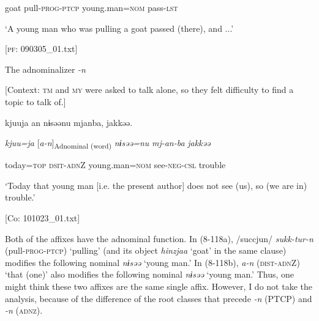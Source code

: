     goat  pull-\textsc{prog}-\textsc{ptcp}  young.man=\textsc{nom}  pass-\textsc{lst}

    ‘A young man who was pulling a goat passed (there), and ...’

  [\textsc{pf}: 090305\_01.txt]
\z

\ex The adnominalizer \textit{{}-n}

  [Context: \textsc{tm} and \textsc{my} were asked to talk alone, so they felt difficulty to find a topic to talk of.]

  {\TM}
\glll   kjuuja  an  nɨsəənu  mjanba,  jakkəə.

    \textit{kjuu=ja}  [\textit{a-n}]\textsubscript{Adnominal (word)}  \textit{nɨsəə=nu}  \textit{mj-an-ba}  \textit{jakkəə}

    today=\textsc{top}  \textsc{dsit}-\textsc{adn}Z  young.man=\textsc{nom}  see-\textsc{neg}-\textsc{csl}  trouble

    ‘Today that young man [i.e. the present author] does not see (us), so (we are in) trouble.’

  [Co: 101023\_01.txt]
\z

Both of the affixes have the adnominal function. In (8\nobreakdash-118a), /succjun/ \textit{sukk-tur-n} (pull-\textsc{prog}-\textsc{ptcp}) ‘pulling’ (and its object \textit{hinzjaa} ‘goat’ in the same clause) modifies the following nominal \textit{nɨsəə} ‘young man.’ In (8\nobreakdash-118b), \textit{a-n} (\textsc{dist}-\textsc{adn}Z) ‘that (one)’ also modifies the following nominal \textit{nɨsəə} ‘young man.’ Thus, one might think these two affixes are the same single affix. However, I do not take the analysis, because of the difference of the root classes that precede \textit{{}-n} (PTCP) and \textit{-n} (\textsc{adnz}).

